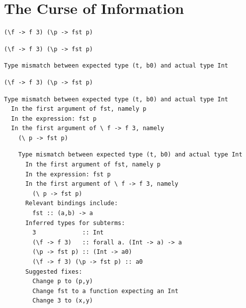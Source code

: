 \documentclass[xcolor=svgnames,12pt,aspectratio=169]{beamer}
\newenvironment{xframe}[1][]
  {\begin{frame}[fragile,environment=xframe,#1]}
  {\end{frame}}
\begin{document}
\section{The Curse of Information}

\begin{xframe}{}
  \begin{center}
\begin{BVerbatim}
(\f -> f 3) (\p -> fst p)
\end{BVerbatim}
  \end{center}
\end{xframe}

\begin{xframe}{}

  \begin{center}
    \begin{BVerbatim}
(\f -> f 3) (\p -> fst p)
    \end{BVerbatim}

    \begin{Verbatim}
Type mismatch between expected type (t, b0) and actual type Int
    \end{Verbatim}
  \end{center}
\end{xframe}

\begin{xframe}

  \begin{center}
    \begin{BVerbatim}
(\f -> f 3) (\p -> fst p)
    \end{BVerbatim}

\begin{Verbatim}
Type mismatch between expected type (t, b0) and actual type Int
  In the first argument of fst, namely p
  In the expression: fst p
  In the first argument of \ f -> f 3, namely
    (\ p -> fst p)
\end{Verbatim}
  \end{center}
\end{xframe}

\begin{xframe}
  \footnotesize
\begin{Verbatim}
    Type mismatch between expected type (t, b0) and actual type Int
      In the first argument of fst, namely p
      In the expression: fst p
      In the first argument of \ f -> f 3, namely
        (\ p -> fst p)
      Relevant bindings include:
        fst :: (a,b) -> a
      Inferred types for subterms:
        3             :: Int
        (\f -> f 3)   :: forall a. (Int -> a) -> a
        (\p -> fst p) :: (Int -> a0)
        (\f -> f 3) (\p -> fst p) :: a0
      Suggested fixes:
        Change p to (p,y)
        Change fst to a function expecting an Int
        Change 3 to (x,y)
\end{Verbatim}
\end{xframe}
\end{document}
